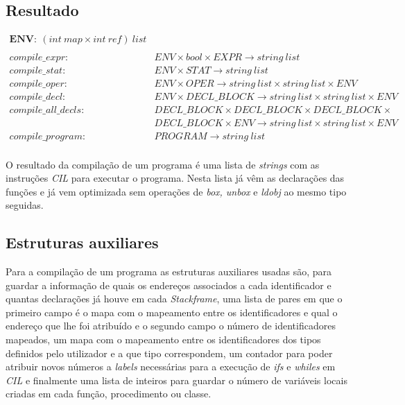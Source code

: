 \subsection{Resultado}
{
\fontsize{9pt}{10}\selectfont
\ttfamily
$$
\begin{array}{lll}
\textbf{ENV}:~(int~map \times int~ref)~list\\\\
compile\_expr:			&ENV \times bool \times EXPR \rightarrow string~list\\
compile\_stat:			&ENV \times STAT \rightarrow string~list\\
compile\_oper:			&ENV \times	OPER \rightarrow string~list \times 
														string~list \times ENV\\
compile\_decl:			&ENV \times DECL\_BLOCK \rightarrow string~list \times 
														string~list \times ENV\\
compile\_all\_decls:	&DECL\_BLOCK \times DECL\_BLOCK \times DECL\_BLOCK 
																	\times \\
						&DECL\_BLOCK \times ENV \rightarrow string~list 
												\times string~list \times ENV\\
compile\_program:	&PROGRAM \rightarrow string~list\\
\end{array}
$$
}

O resultado da compilação de um programa é uma lista de \emph{strings} com as 
instruções \emph{CIL} para executar o programa. Nesta lista já vêm as 
declarações das funções e já vem optimizada sem operações de \emph{box, unbox} 
e \emph{ldobj} ao mesmo tipo seguidas.

\subsection{Estruturas auxiliares}

Para a compilação de um programa as estruturas auxiliares usadas são, para 
guardar a informação de quais os endereços associados a cada identificador e 
quantas declarações já houve em cada \emph{Stackframe}, uma lista de pares em 
que o primeiro campo é o mapa com o mapeamento entre os identificadores e qual 
o endereço que lhe foi atribuído e o segundo campo o número de identificadores 
mapeados, um mapa com o mapeamento entre os identificadores dos tipos definidos 
pelo utilizador e a que tipo correspondem, um contador para poder atribuir 
novos números a \emph{labels} necessárias para a execução de \emph{ifs} e 
\emph{whiles} em \emph{CIL} e finalmente uma lista de inteiros para guardar o 
número de variáveis locais criadas em cada função, procedimento ou classe.

